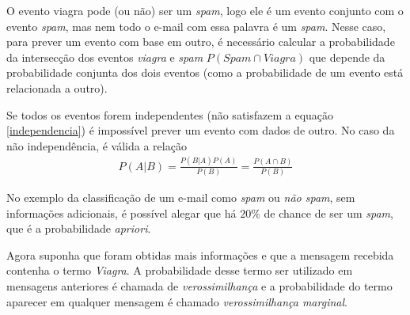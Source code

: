 O evento viagra pode (ou não) ser um \emph{spam}, logo ele é um evento conjunto com o evento \emph{spam}, mas nem todo o e-mail com essa palavra é um \emph{spam}. Nesse caso, para prever um evento com base em outro, é necessário calcular a probabilidade da intersecção dos eventos \emph{viagra} e \emph{spam} \(P(Spam \cap Viagra)\) que depende da probabilidade conjunta dos dois eventos (como a probabilidade de um evento está relacionada a outro).

Se todos os eventos forem independentes (não satisfazem a equação \eqref{independencia}) é impossível prever um evento com dados de outro. No caso da não independência, é válida a relação
\begin{align}
P(A|B) =  \frac{P(B|A)P(A)}{P(B)} = \frac{P(A \cap B)}{P(B)} \label{BAYES}
\end{align}

No exemplo da classificação de um e-mail como \emph{spam} ou \emph{não spam}, sem informações adicionais, é possível alegar que há \(20\%\) de chance de ser um \emph{spam}, que é a probabilidade \emph{apriori}.

Agora suponha que foram obtidas mais informações e que a mensagem recebida contenha o termo \emph{Viagra}. A probabilidade desse termo ser utilizado em mensagens anteriores é chamada de \emph{verossimilhança} e a probabilidade do termo aparecer em qualquer mensagem é chamado \emph{verossimilhança marginal}.

